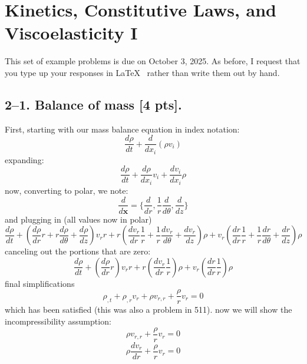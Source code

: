 \setcounter{section}{1} %

\section{Kinetics, Constitutive Laws, and Viscoelasticity I}
\label{PS2}

This set of example problems is due on October 3, 2025. 
As before, I request that you type up your responses in \LaTeX~ rather than write them out by hand. 

\medskip
\subsection*{2--1. \textbf{Balance of mass} [4 pts].} 
First, starting with our mass balance equation in index notation:
\begin{equation}
    \frac{d\rho}{dt}+\frac{d}{dx_i}(\rho v_i)
\end{equation}
expanding:
\begin{equation}
    \frac{d\rho}{dt}+\frac{d\rho}{dx_i}v_i+\frac{dv_i}{dx_i}\rho
\end{equation}
now, converting to polar, we note:
\begin{equation}
    \frac{d}{d\bm{x}} = \{\frac{d}{dr},\frac{1}{r}\frac{d}{d\theta},\frac{d}{dz}\}
\end{equation}
and plugging in (all values now in polar)
\begin{equation}
    \frac{d\rho}{dt}+(\frac{d\rho}{dr}r+r\frac{d\rho}{d\theta}+\frac{d\rho}{dz})v_rr+r(\frac{dv_r}{dr}\frac{1}{r}+\frac{1}{r}\frac{dv_r}{d\theta}+\frac{dv_r}{dz})\rho+v_r(\frac{dr}{dr}\frac{1}{r}+\frac{1}{r}\frac{dr}{d\theta}+\frac{dr}{dz})\rho
\end{equation}
canceling out the portions that are zero:
\begin{equation}
    \frac{d\rho}{dt}+(\frac{d\rho}{dr}r)v_rr+r(\frac{dv_r}{dr}\frac{1}{r})\rho+v_r(\frac{dr}{dr}\frac{1}{r})\rho
\end{equation}
final simplifications 
\begin{equation}
    \boxed{\rho_{,t}+\rho_{,r}v_r+\rho v_{r,r}+\frac{\rho}{r}v_r = 0 }
\end{equation}
which has been satisfied (this was also a problem in 511). now we will show the incompressibility assumption:
\begin{equation}
    \rho v_{r,r}+\frac{\rho}{r}v_r = 0
\end{equation}
\begin{equation}
    \rho \frac{dv_r}{dr}+\frac{\rho}{r}v_r = 0
\end{equation}
